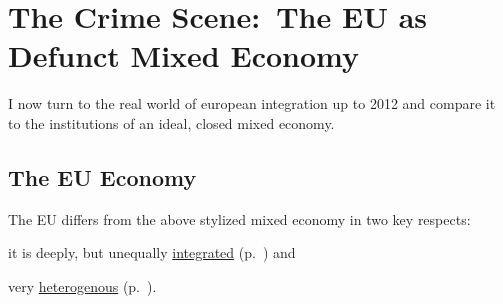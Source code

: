 


\section{The Crime Scene:~The EU as Defunct Mixed Economy} \label{sec:EU-reality}
I now turn to the real world of european integration up to 2012 and compare it to the institutions of an ideal, closed mixed economy.

	\subsection{The EU Economy}
The \gls{EU} differs from the above stylized mixed economy in two key respects:
\begin{inparaenum}[1)]
	\item it is deeply, but unequally \hyperref[sec:EU-Acquis]{integrated} (p.~\pageref{sec:EU-Acquis}) and
	\item very \hyperref[sec:sources-of-wealth]{heterogenous} (p.~\pageref{sec:sources-of-wealth}).
\end{inparaenum}

